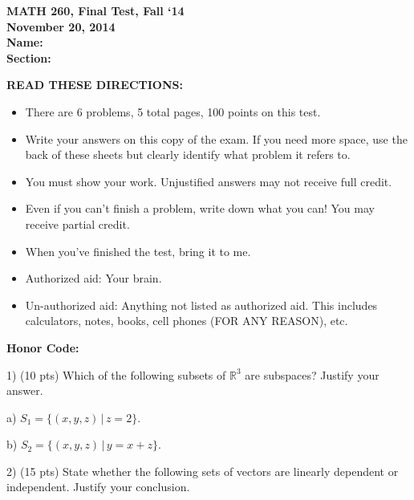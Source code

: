 \documentclass{article}
\begin{document}
\begin{flushleft}
	\bfseries{MATH 260, Final Test, Fall `14}\\
	\bfseries{November 20, 2014}\\
	\vspace{0.5in}
	\bfseries{Name:}\\
	\vspace{0.2in}
	\bfseries{Section:}\\
	\vspace{.5in}
		
	\bfseries{READ THESE DIRECTIONS:}
	\begin{itemize}
		\item{There are 6 problems, 5 total pages, 100 points on this test.}
		\item{Write your answers on this copy of the exam.   If you need more space, use the back of these sheets but clearly identify what problem it refers to.}
		\item{You must show your work.  Unjustified answers may not receive full credit.}
		\item{Even if you can't finish a problem, write down what you can!  You may receive partial credit.}
		\item{When you've finished the test, bring it to me.} %
		\item{Authorized aid:  Your brain.}
		\item{Un-authorized aid:  Anything not listed as authorized aid.  This includes calculators, notes, books, cell phones (FOR ANY REASON), etc.}
	\end{itemize}

\vspace{1in}

\bfseries{Honor Code:}

\pagebreak

1) (10 pts) Which of the following subsets of $\mathbb{R}^3$ are subspaces?  Justify your answer.

\vspace{.25in}

a) $S_1 = \{(x,y,z) \,|\, z = 2\}$.

\vspace{1.5in}

b) $S_2 = \{(x,y,z) \,|\, y = x + z\}$.

\vspace{1.5in}

2) (15 pts) State whether the following sets of vectors are linearly dependent or independent.  Justify your conclusion.


\end{flushleft}
\end{document}
